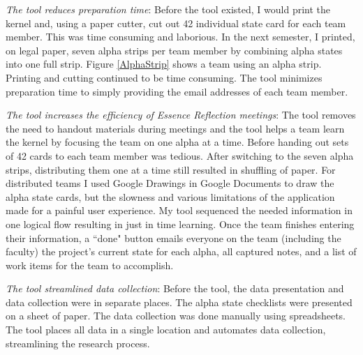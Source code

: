 \documentclass[preprint,12pt,3p]{elsarticle}
\begin{document}
\textit{The tool reduces preparation time}: Before the tool existed, I would print the kernel and, using a paper cutter, cut out 42 individual state card for each team member. This was time consuming and laborious.  In the next semester, I printed, on legal paper, seven alpha strips per team member by combining alpha states into one full strip. Figure \ref{AlphaStrip} shows a team using an alpha strip. Printing and cutting continued to be time consuming. The tool minimizes preparation time to simply providing the email addresses of each team member. 

\textit{The tool increases the efficiency of Essence Reflection meetings}: The tool removes the need to handout materials during meetings and the tool helps a team learn the kernel by focusing the team on one alpha at a time. Before handing out sets of 42 cards to each team member was tedious. After switching to the seven alpha strips, distributing them one at a time still resulted in shuffling of paper. For distributed teams I used Google Drawings in Google Documents to draw the alpha state cards, but the slowness and various limitations of the application made for a painful user experience. My tool sequenced the needed information in one logical flow resulting in just in time learning. Once the team finishes entering their information, a ``done" button emails everyone on the team (including the faculty) the project's current state for each alpha, all captured notes, and a list of work items for the team to accomplish. 

\textit{The tool streamlined data collection}:  Before the tool, the data presentation and data collection were in separate places. The alpha state checklists were presented on a sheet of paper. The data collection was done manually using spreadsheets. The tool places all data in a single location and automates data collection, streamlining the research process.

\end{document}
